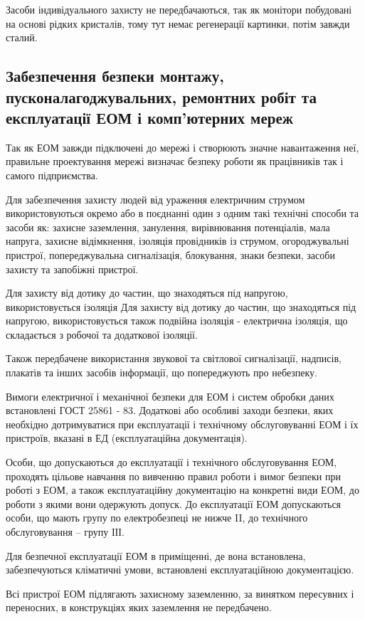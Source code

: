 \par Засоби індивідуального захисту не передбачаються, так як монітори побудовані на основі рідких кристалів, тому тут немає регенерації картинки, потім завжди сталий.



\subsection{Забезпечення безпеки монтажу, пусконалагоджувальних, ремонтних робіт та експлуатації ЕОМ і комп’ютерних мереж}

\par Так як ЕОМ завжди підключені до мережі і створюють значне навантаження неї, правильне проектування мережі визначає безпеку роботи як працівників так і самого підприємства.
\par Для забезпечення захисту людей від ураження електричним струмом використовуються окремо або в поєднанні один з одним такі технічні способи та засоби як: захисне заземлення, занулення, вирівнювання потенціалів, мала напруга, захисне відімкнення, ізоляція провідників із струмом, огороджувальні пристрої, попереджувальна сигналізація, блокування, знаки безпеки, засоби захисту та запобіжні пристрої.
\par Для захисту від дотику до частин, що знаходяться під напругою, використовується ізоляція Для захисту від дотику до частин, що знаходяться під напругою, використовується також подвійна ізоляція - електрична ізоляція, що складається з робочої та додаткової ізоляції.
\par Також передбачене використання звукової та світлової сигналізації, надписів, плакатів та інших засобів інформації, що попереджують про небезпеку.

\par Вимоги електричної і механічної безпеки для ЕОМ і систем обробки даних встановлені ГОСТ 25861 - 83. Додаткові або особливі заходи безпеки, яких необхідно дотримуватися при експлуатації і технічному обслуговуванні ЕОМ і їх пристроїв, вказані в ЕД (експлуатаційна документація).
\par Особи, що допускаються до експлуатації і технічного обслуговування ЕОМ, проходять цільове навчання по вивченню правил роботи і вимог безпеки при роботі з ЕОМ, а також експлуатаційну документацію на конкретні види ЕОМ, до роботи з якими вони одержують допуск. До експлуатації ЕОМ допускаються особи, що мають групу по електробезпеці не нижче II, до технічного обслуговування -- групу ІІІ.
\par Для безпечної експлуатації ЕОМ в приміщенні, де вона встановлена, забезпечуються кліматичні умови, встановлені експлуатаційною документацією.
\par Всі пристрої ЕОМ підлягають захисному заземленню, за винятком пересувних і переносних, в конструкціях яких заземлення не передбачено.

